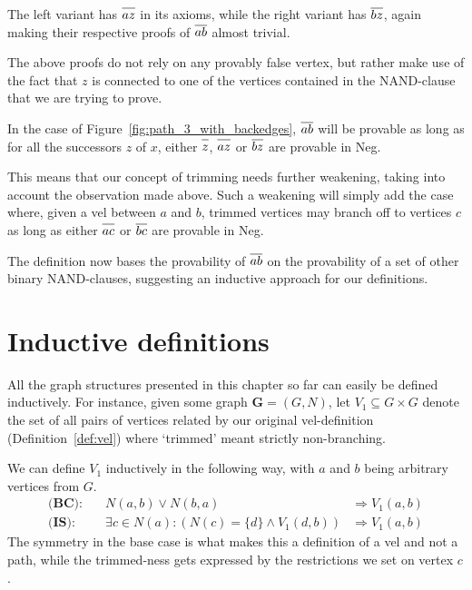 The left variant has $\ol{az}$ in its axioms, while the right variant has $\ol{bz}$, again making their respective proofs of $\ol{ab}$ almost trivial.\par
\begin{figure}[!h]
  \centering
  \begin{prooftree}
  \end{prooftree}
  \hspace{5mm}
  \begin{prooftree}
  \end{prooftree}
  \caption{}
  \label{fig:proof_loop}
\end{figure}
\FloatBarrier
The above proofs do not rely on any provably false vertex, but rather make use of the fact that $z$ is connected to one of the vertices contained in the NAND-clause that we are trying to prove.

In the case of Figure~\ref{fig:path_3_with_backedges}, $\ol{ab}$ will be provable as long as for all the successors $z$ of $x$, either $\ol{z}$, $\ol{az}$ or $\ol{bz}$ are provable in Neg.

This means that our concept of trimming needs further weakening, taking into account the observation made above.
Such a weakening will simply add the case where, given a vel between $a$ and $b$, trimmed vertices may branch off to vertices $c$ as long as either $\ol{ac}$ or $\ol{bc}$ are provable in Neg.

The definition now bases the provability of $\ol{ab}$ on the provability of a set of other binary NAND-clauses, suggesting an inductive approach for our definitions.

\section{Inductive definitions}
\label{sec:Inductive definitions}
All the graph structures presented in this chapter so far can easily be defined inductively.
For instance, given some graph $\mathbf{G}=(G,N)$, let $V_1 \subseteq G \times G$ denote the set of all pairs of vertices related by our original vel-definition (Definition~\ref{def:vel}) where `trimmed' meant strictly non-branching.

We can define $V_1$ inductively in the following way, with $a$ and $b$ being arbitrary vertices from $G$.
\begin{align}
  \textbf{(BC):}&\quad N(a,b) \vee N(b,a) &\Rightarrow  V_1(a,b)\\
  \textbf{(IS):}&\quad \exists c \in N(a): (N(c) =\{d\} \wedge V_1(d,b)) &\Rightarrow V_1(a,b)
\end{align}
The symmetry in the base case is what makes this a definition of a vel and not a path, while the trimmed-ness gets expressed by the restrictions we set on vertex $c$.

